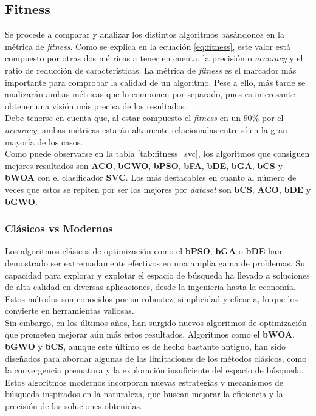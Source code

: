 \subsection{Fitness}
Se procede a comparar y analizar los distintos algoritmos basándonos en la métrica de \textit{fitness}. Como se explica en la ecuación \ref{eq:fitness}, este valor está compuesto por otras dos métricas a tener en cuenta, la precisión o \textit{accuracy} y el ratio de reducción de características. La métrica de \textit{fitness} es el marcador más importante para comprobar la calidad de un algoritmo. Pese a ello, más tarde se analizarán ambas métricas que lo componen por separado, pues es interesante obtener una visión más precisa de los resultados.\\[6pt]
Debe tenerse en cuenta que, al estar compuesto el \textit{fitness} en un $90\%$ por el \textit{accuracy}, ambas métricas estarán altamente relacionadas entre sí en la gran mayoría de los casos.\\[6pt]
Como puede observarse en la tabla \ref{tab:fitness_svc}, los algoritmos que consiguen mejores resultados son \textbf{ACO}, \textbf{bGWO}, \textbf{bPSO}, \textbf{bFA}, \textbf{bDE}, \textbf{bGA}, \textbf{bCS} y \textbf{bWOA} con el clasificador \textbf{SVC}. Los más destacables en cuanto al número de veces que estos se repiten por ser los mejores por \textit{dataset} son \textbf{bCS}, \textbf{ACO}, \textbf{bDE} y \textbf{bGWO}.

\subsubsection{Clásicos vs Modernos}
Los algoritmos clásicos de optimización como el \textbf{bPSO}, \textbf{bGA} o \textbf{bDE} han demostrado ser extremadamente efectivos en una amplia gama de problemas. Su capacidad para explorar y explotar el espacio de búsqueda ha llevado a soluciones de alta calidad en diversas aplicaciones, desde la ingeniería hasta la economía. Estos métodos son conocidos por su robustez, simplicidad y eficacia, lo que los convierte en herramientas valiosas.\\[6pt]
Sin embargo, en los últimos años, han surgido nuevos algoritmos de optimización que prometen mejorar aún más estos resultados. Algoritmos como el \textbf{bWOA}, \textbf{bGWO} y \textbf{bCS}, aunque este último es de hecho bastante antiguo, han sido diseñados para abordar algunas de las limitaciones de los métodos clásicos, como la convergencia prematura y la exploración insuficiente del espacio de búsqueda. Estos algoritmos modernos incorporan nuevas estrategias y mecanismos de búsqueda inspirados en la naturaleza, que buscan mejorar la eficiencia y la precisión de las soluciones obtenidas.\\[6pt]

